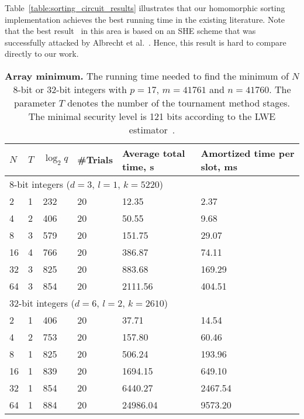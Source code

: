 Table~\ref{table:sorting_circuit_results} illustrates that our homomorphic sorting implementation achieves the best running time in the existing literature.
Note that the best result~\cite{CDSS15} in this area is based on an SHE scheme that was successfully attacked by Albrecht et al.~\cite{C:AlbBaiDuc16}.
Hence, this result is hard to compare directly to our work.

\begin{table}[h]
  \centering
  \begin{tabular*}{.45\textwidth}{ p{0.2cm} p{0.2cm} p{0.8cm} p{0.9cm} p{1.5cm} p{2.0cm}}
    \toprule
    $N$     & $T$   & $\log_2 q$    & \#Trials  & Average total time, s    & Amortized time per slot, ms \\
    \midrule
    \multicolumn{6}{l}{8-bit integers ($d=3$, $l=1$, $k=5220$)} \\
    \cmidrule(lr){1-6}
    2       & 1     & 232           & 20        & 12.35     & 2.37 \\
    4       & 2     & 406           & 20        & 50.55     & 9.68 \\
    8       & 3     & 579           & 20        & 151.75    & 29.07 \\
    16      & 4     & 766           & 20        & 386.87    & 74.11 \\
    32      & 3     & 825           & 20        & 883.68    & 169.29 \\
    64      & 3     & 854           & 20        & 2111.56   & 404.51 \\
    \midrule
    \multicolumn{6}{l}{32-bit integers ($d=6$, $l=2$, $k=2610$)} \\
    \cmidrule(lr){1-6}
    2       & 1     & 406           & 20        & 37.71     & 14.54 \\
    4       & 2     & 753           & 20        & 157.80    & 60.46 \\
    8       & 1     & 825           & 20        & 506.24    & 193.96 \\
    16      & 1     & 839           & 20        & 1694.15   & 649.10 \\
    32      & 1     & 854           & 20        & 6440.27   & 2467.54 \\
    64      & 1     & 884           & 20        & 24986.04  & 9573.20 \\
    \bottomrule
  \end{tabular*}
  \caption{\textbf{Array minimum.} The running time needed to find the minimum of $N$ 8-bit or 32-bit integers with $p=17$, $m=41761$ and $n=41760$. The parameter $T$ denotes the number of the tournament method stages. The minimal security level is 121 bits according to the LWE estimator~\cite{lwe_estimator}.}
  \label{table:minimum_circuit_results}
\end{table}

